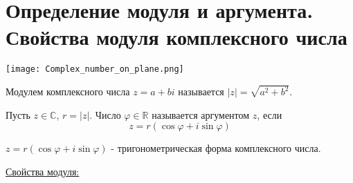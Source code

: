 
\section{Определение модуля и аргумента. Свойства модуля комплексного числа}
\texttt{[image: Complex\_number\_on\_plane.png]} 
\begin{conj}
    Модулем комплексного числа $z = a + bi$ называется $|z| = \sqrt{a^2 + b^2}$.
\end{conj}
\begin{conj}
    Пусть $z \in \mathbb{C}$, $r = |z|$. Число $\varphi \in \mathbb{R}$ называется аргументом $z$, если 
    \[ z = r(\cos\varphi + i\sin\varphi) \]
\end{conj}
\begin{conj}
    $ z = r(\cos\varphi + i\sin\varphi)$ - тригонометрическая форма комплексного числа.
\end{conj}
\underline{Свойства модуля:}
